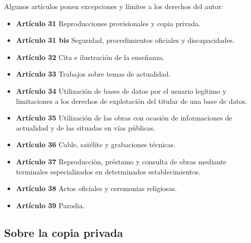 Algunos artículos ponen excepciones y límites a los derechos del autor:
\begin{itemize}
    \item\textbf{Artículo 31} Reproducciones provisionales y copia privada.
    \item\textbf{Artículo 31 bis} Seguridad, procedimientos oficiales y discapacidades.
    \item\textbf{Artículo 32} Cita e ilustración de la enseñanza.
    \item\textbf{Artículo 33} Trabajos sobre temas de actualidad.
    \item\textbf{Artículo 34} Utilización de bases de datos por el usuario legítimo y limitaciones a los derechos de explotación del titular de una base de datos.
    \item\textbf{Artículo 35} Utilización de las obras con ocasión de informaciones de actualidad y de las situadas en vías públicas.
    \item\textbf{Artículo 36} Cable, satélite y grabaciones técnicas.
    \item\textbf{Artículo 37} Reproducción, préstamo y consulta de obras mediante terminales especializados en determinados establecimientos.
    \item\textbf{Artículo 38} Actos oficiales y ceremonias religiosas.
    \item\textbf{Artículo 39} Parodia.
\end{itemize}

\subsection{Sobre la copia privada}

